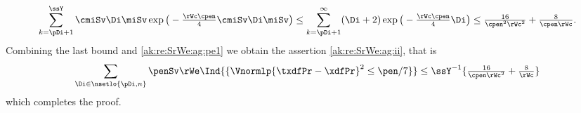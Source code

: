 \begin{pro}
\begin{displaymath}
    \sum_{k=\pDi+1}^{\ssY}\cmiSv\Di \miSv\exp\big(-\tfrac{\rWc\cpen}{4}\cmiSv\Di\miSv\big)
    \leq \sum_{k=\pDi+1}^\infty(\Di+2)\exp\big(-\tfrac{\rWc\cpen}{4}\Di\big)
    \leq \tfrac{16}{\cpen^2\rWc^{2}}+ \tfrac{8}{\cpen\rWc}.
  \end{displaymath}
  Combining the last bound and \eqref{ak:re:SrWe:ag:pe1} we obtain the
  assertion \ref{ak:re:SrWe:ag:ii}, that is
  \begin{displaymath}
    \sum_{\Di\in\nsetlo{\pDi,n}}\penSv\rWe\Ind{\{\Vnormlp{\txdfPr-\xdfPr}^2\leq\pen/7\}}
    \leq \ssY^{-1}\{\tfrac{16}{\cpen\rWc^{2}}+ \tfrac{8}{\rWc}\}
  \end{displaymath}
  which completes the proof.\proEnd
\end{pro}
